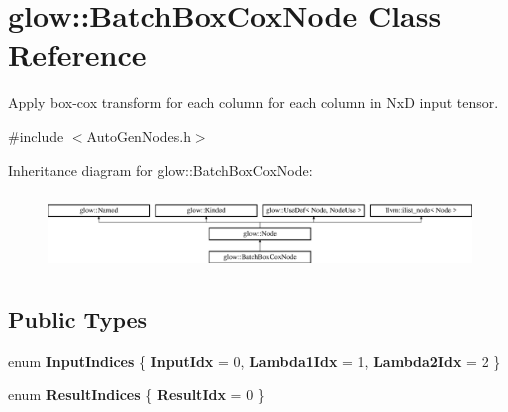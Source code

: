 \hypertarget{classglow_1_1_batch_box_cox_node}{}\section{glow\+:\+:Batch\+Box\+Cox\+Node Class Reference}
\label{classglow_1_1_batch_box_cox_node}


Apply box-\/cox transform for each column for each column in NxD input tensor.  




{\ttfamily \#include $<$Auto\+Gen\+Nodes.\+h$>$}

Inheritance diagram for glow\+:\+:Batch\+Box\+Cox\+Node\+:\begin{figure}[H]
\begin{center}
\leavevmode
\includegraphics[height=2.028986cm]{classglow_1_1_batch_box_cox_node}
\end{center}
\end{figure}
\subsection*{Public Types}
\begin{DoxyCompactItemize}
\item 
\mbox{\label{classglow_1_1_batch_box_cox_node_ac71f03c0bec87e39debb6d1dd7d8251a}} 
enum {\bfseries Input\+Indices} \{ {\bfseries Input\+Idx} = 0, 
{\bfseries Lambda1\+Idx} = 1, 
{\bfseries Lambda2\+Idx} = 2
 \}
\item 
\mbox{\label{classglow_1_1_batch_box_cox_node_af5ce5cfd7636ec7c5a9e839a56cb58d3}} 
enum {\bfseries Result\+Indices} \{ {\bfseries Result\+Idx} = 0
 \}
\end{DoxyCompactItemize}
